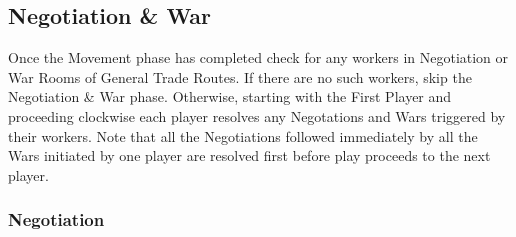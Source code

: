 \documentclass[10pt,twocolumn]{article}
\begin{document}
\subsection{Negotiation \& War}
Once the Movement phase has completed check for any workers in Negotiation or War Rooms of General Trade Routes. If there are no such workers, skip the Negotiation \& War phase. Otherwise, starting with the First Player and proceeding clockwise each player resolves any Negotations and Wars triggered by their workers. Note that all the Negotiations followed immediately by all the Wars initiated by one player are resolved first before play proceeds to the next player. 

\subsubsection{Negotiation}
\iftoggle{original-rules}{
If the active player has a worker on a Negotiation Room, he, and the player at the other end of the General Trade Route must now decide if they want to be peaceful or aggressive. If they want to be peaceful, they should indicate this with a ``thumbs-up'' gesture. If they want to be aggressive, they should indicate this with a ``thumbs-down'' gesture.
}{
If the active player has a worker on a Negotiation Room, he, and the player at the other end of the General Trade Route must now decide if they want to be peaceful or aggressive. To do this, one player takes the Patton token and the other player takes the Genghis Khan token. Each player secretly choses a side. If they want to be aggressive, they should indicate this by selecting the side which is red (which will have the number 1 on it). If they want to peaceful, they should indicate this by selecting the side which is blue (which will have the number 2 on it). Once both players have selected a side, they are revealed simultaneously and resolved as follows:
}
\end{document}
